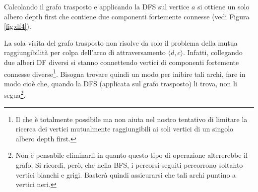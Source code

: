 Calcolando il grafo trasposto e applicando la DFS sul vertice $a$ si ottiene un solo albero depth first che contiene due componenti fortemente connesse (vedi Figura \ref{fig:df4}).
\begin{center}
\begin{minipage}{.3\textwidth}
	\centering
\end{minipage}
\hfil
\begin{minipage}{.3\textwidth}
	\centering
 \label{fig:df4}
\end{minipage}
 \end{center}

La sola visita del grafo trasposto non risolve da solo il problema della mutua raggiungibilità per colpa dell'arco di attraversamento $\langle d,c\rangle$. Infatti, collegando due alberi DF diversi si stanno connettendo vertici di componenti fortemente connesse diverse\footnote{Il che è totalmente possibile ma non aiuta nel nostro tentativo di limitare la ricerca dei vertici mutualmente raggiungibili ai soli vertici di un singolo albero depth first.}. Bisogna trovare quindi un modo per inibire tali archi, fare in modo cioè che, quando la DFS (applicata sul grafo trasposto) li trova, non li segua\footnote{Non è pensabile eliminarli in quanto questo tipo di operazione altererebbe il grafo. Si ricordi, però, che nella BFS, i percorsi seguiti percorrono soltanto vertici bianchi e grigi. Basterà quindi assicurarsi che tali archi puntino a vertici neri.}.

